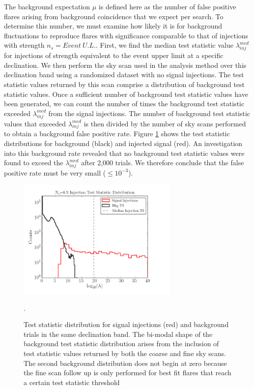 \documentclass{gatech-thesis}
\begin{document}
The background expectation $\mu$ is defined here as the number of false positive flares arising from background coincidence that we expect per search. To determine this number, we must examine how likely it is for background fluctuations to reproduce flares with significance comparable to that of injections with strength $n_s = Event \: U.L.$. First, we find the median test statistic value $\lambda_{inj}^{med}$ for injections of strength equivalent to the event upper limit at a specific declination. We then perform the sky scan used in the analysis method over this declination band using a randomized dataset with no signal injections. The test statistic values returned by this scan comprise a distribution of background test statistic values. Once a sufficient number of background test statistic values have been generated, we can count the number of times the background test statistic exceeded $\lambda_{inj}^{med}$ from the signal injections. The number of background test statistic values that exceeded $\lambda_{inj}^{med}$ is then divided by the number of sky scans performed to obtain a background false positive rate. Figure \ref{fig:AccidentalChkGRBBackground} shows the test statistic distributions for background (black) and injected signal (red). An investigation into this background rate revealed that no background test statistic values were found to exceed the $\lambda_{inj}^{med}$ after 2,000 trials. We therefore conclude that the false positive rate must be very small ($\leq 10^{-3}$).
\begin{figure}[ht]
  \begin{center}
    \includegraphics[width=0.7\textwidth,keepaspectratio]{NSInjection_TS_Distribution_WithBkgTSDistribution.png}
  \end{center}
  \caption[Background Test Statistic Check]{Test statistic distribution for signal injections (red) and background trials in the same declination band. The bi-modal shape of the background test statistic distribution arises from the inclusion of test statistic values returned by both the coarse and fine sky scans. The second background distribution does not begin at zero because the fine scan follow up is only performed for best fit flares that reach a certain test statistic threshold}.
  \label{fig:AccidentalChkGRBBackground}
\end{figure}
\end{document}
